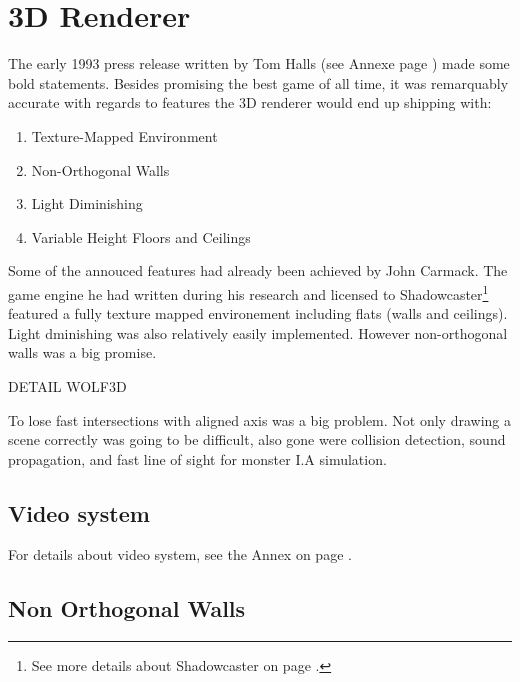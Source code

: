 \section{3D Renderer}
The early 1993 press release written by Tom Halls (see Annexe page \pageref{label_press_release}) made some bold statements. Besides promising the best game of all time, it was remarquably accurate with regards to features the 3D renderer would end up shipping with:\\
\par
\begin{enumerate}
\item Texture-Mapped Environment
\item Non-Orthogonal Walls
\item Light Diminishing
\item Variable Height Floors and Ceilings
\end{enumerate}
\par
Some of the annouced features had already been achieved by John Carmack. The game engine he had written during his research and licensed to Shadowcaster\footnote{See more details about Shadowcaster on page \pageref{label_shadowcaster}.} featured a fully texture mapped environement including flats (walls and ceilings). Light dminishing was also relatively easily implemented. However non-orthogonal walls was a big promise.\\
\par
DETAIL WOLF3D\\
\par
To lose fast intersections with aligned axis was a big problem. Not only drawing a scene correctly was going to be difficult, also gone were collision detection, sound propagation, and fast line of sight for monster I.A simulation.\\
\par


\subsection{Video system}

For details about \NeXT video system, see the Annex on page \pageref{labe_next_video_system}.\\
\par

\subsection{Non Orthogonal Walls}

